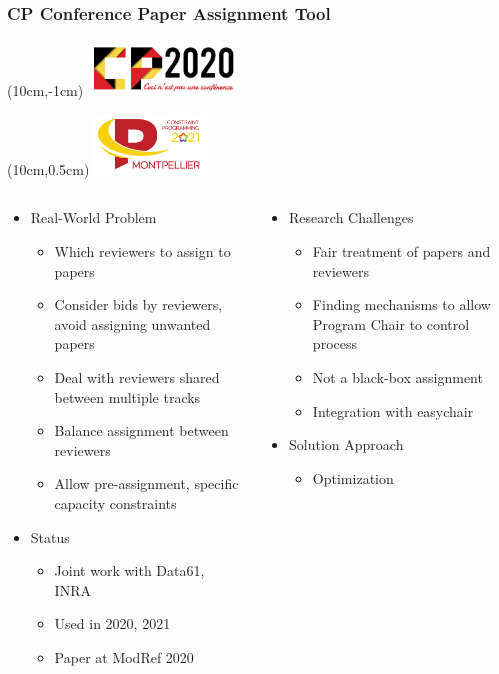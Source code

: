 \begin{frame}
\frametitle{CP Conference Paper Assignment Tool}
\begin{textblock*}{4cm}(10cm,-1cm)
\includegraphics[width=4cm]{images/cp2020logo}
\end{textblock*}
\begin{textblock*}{3cm}(10cm,0.5cm)
\includegraphics[width=3cm]{images/cp2021logo}
\end{textblock*}
\begin{columns}[b]
\begin{column}{0.5\textwidth}
\begin{itemize}
\item Real-World Problem
\begin{itemize}
\item Which reviewers to assign to papers 
\item Consider bids by reviewers, avoid assigning unwanted papers
\item Deal with reviewers shared between multiple tracks 
\item Balance assignment between reviewers
\item Allow pre-assignment, specific capacity constraints
\end{itemize}
\item Status
\begin{itemize}
\item Joint work with Data61, INRA
\item Used in 2020, 2021
\item Paper at ModRef 2020
\end{itemize}
\end{itemize}
\end{column}
\begin{column}{0.5\textwidth}
\begin{itemize}
\item Research Challenges
\begin{itemize}
\item Fair treatment of papers and reviewers
\item Finding mechanisms to allow Program Chair to control process
\item Not a black-box assignment
\item Integration with easychair
\end{itemize}
\item Solution Approach
\begin{itemize}
\item Optimization
\end{itemize}
\end{itemize}
\end{column}
\end{columns}
\end{frame}

